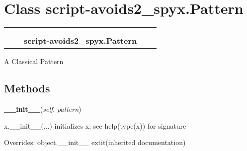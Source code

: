 %
%
%


\section{Class script-avoids2\_spyx.Pattern}

    \label{script-avoids2_spyx:Pattern}
\begin{tabular}{cccccc}
\multicolumn{2}{r}{\settowidth{\BCL}{object}\multirow{2}{\BCL}{object}}
&&
  \\\cline{3-3}
  &&\multicolumn{1}{c|}{}
&&
  \\
&&\multicolumn{2}{l}{\textbf{script-avoids2\_spyx.Pattern}}
\end{tabular}

A Classical Pattern



  \subsection{Methods}

    \vspace{0.5ex}

\hspace{.8\funcindent}\begin{boxedminipage}{\funcwidth}

    \raggedright \textbf{\_\_init\_\_}(\textit{self}, \textit{pattern})

\setlength{\parskip}{2ex}
    x.\_\_init\_\_(...) initializes x; see help(type(x)) for signature

\setlength{\parskip}{1ex}
      Overrides: object.\_\_init\_\_ 	extit{(inherited documentation)}

    \end{boxedminipage}

